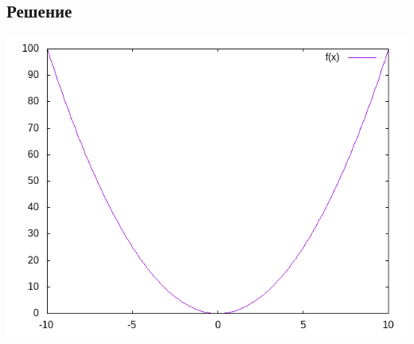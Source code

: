\documentclass[11pt]{article}
\newcounter{th}\setcounter{th}{0}
\begin{document}
\subsection{Решение}
\label{sec:orgeab4a70}
\begin{center}
\includegraphics[width=.9\linewidth]{img/res.png}
\end{center}
\end{document}
